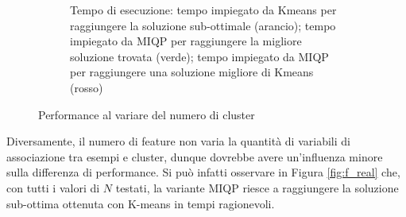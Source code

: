 \documentclass{article}
\begin{document}
\begin{figure}[H]
\begin{subfigure}[t]{0.49\linewidth}
         \caption{Tempo di esecuzione: tempo impiegato da Kmeans per raggiungere la soluzione sub-ottimale (arancio); tempo impiegato da MIQP per raggiungere la migliore soluzione trovata (verde); tempo impiegato da MIQP per raggiungere una soluzione migliore di Kmeans (rosso)}
     \end{subfigure}
        \caption{Performance al variare del numero di cluster}
        \label{fig:k_real}
     \end{figure}
    Diversamente, il numero di feature non varia la quantità di variabili di associazione tra esempi e cluster, dunque dovrebbe avere un'influenza minore sulla differenza di performance. Si può infatti osservare in Figura \ref{fig:f_real} che, con tutti i valori di $N$ testati, la variante MIQP riesce a raggiungere la soluzione sub-ottima ottenuta con K-means in tempi ragionevoli.
\end{document}
